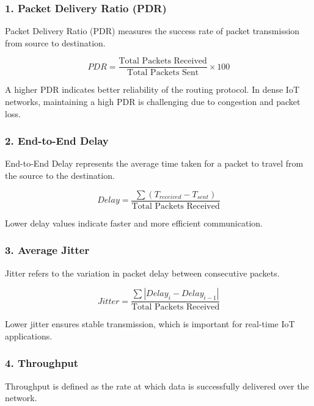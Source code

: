 \documentclass[a4paper,fleqn]{cas-dc}
\numberwithin{equation}{section}
\begin{document}
\subsubsection{1. Packet Delivery Ratio (PDR)}

Packet Delivery Ratio (PDR) measures the success rate of packet transmission from source to destination.

\begin{equation}
PDR = \frac{\text{Total Packets Received}}{\text{Total Packets Sent}} \times 100
\end{equation}

A higher PDR indicates better reliability of the routing protocol. In dense IoT networks, maintaining a high PDR is challenging due to congestion and packet loss.

\subsubsection{2. End-to-End Delay}

End-to-End Delay represents the average time taken for a packet to travel from the source to the destination.

\begin{equation}
Delay = \frac{\sum (T_{received} - T_{sent})}{\text{Total Packets Received}}
\end{equation}

Lower delay values indicate faster and more efficient communication.

\subsubsection{3. Average Jitter}

Jitter refers to the variation in packet delay between consecutive packets.

\begin{equation}
Jitter = \frac{\sum |Delay_i - Delay_{i-1}|}{\text{Total Packets Received}}
\end{equation}

Lower jitter ensures stable transmission, which is important for real-time IoT applications.

\subsubsection{4. Throughput}

Throughput is defined as the rate at which data is successfully delivered over the network.
\end{document}
